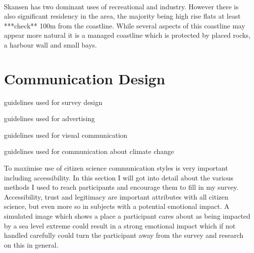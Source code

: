 \paragraph{}
Skansen has two dominant uses of recreational and industry. However there is also significant residency in the area, the majority being high rise flats at least ***check** 100m from the coastline. While several aspects of this coastline may appear more natural it is a managed coastline which is protected by placed rocks, a harbour wall and small bays. 
\paragraph{}

\section{Communication Design}
guidelines used for survey design

guidelines used for advertising

guidelines used for visual communication

guidelines used for communication about climate change

To maximise use of citizen science communication styles is very important including accessibility. In this section I will got into detail about the various methods I used to reach participants and encourage them to fill in my survey. Accessibility, trust and legitimacy are important attributes with all citizen science, but even more so in subjects with a potential emotional impact. A simulated image which shows a place a participant cares about as being impacted by a sea level extreme could result in a strong emotional impact which if not handled carefully could turn the participant away from the survey and research on this in general.


